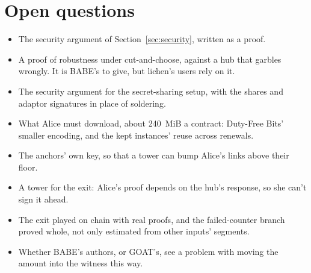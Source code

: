 \documentclass[11pt]{article}
\begin{document}
\section{Open questions}
\label{sec:open}

\begin{itemize}[leftmargin=1.5em]
\item The security argument of Section~\ref{sec:security}, written as a
  proof.
\item A proof of robustness under cut-and-choose, against a hub that
  garbles wrongly. It is BABE's to give, but lichen's users rely on it.
\item The security argument for the secret-sharing setup, with the
  shares and adaptor signatures in place of soldering.
\item What Alice must download, about 240~MiB a contract: Duty-Free
  Bits' smaller encoding, and the kept instances' reuse across renewals.
\item The anchors' own key, so that a tower can bump Alice's links above
  their floor.
\item A tower for the exit: Alice's proof depends on the hub's
  response, so she can't sign it ahead.
\item The exit played on chain with real proofs, and the failed-counter
  branch proved whole, not only estimated from other inputs' segments.
\item Whether BABE's authors, or GOAT's, see a problem with moving the
  amount into the witness this way.
\end{itemize}
\end{document}
